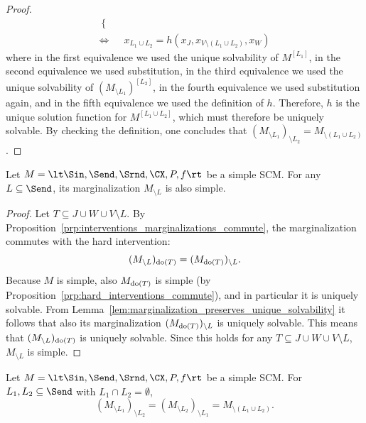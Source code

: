 \begin{proof}
\begin{equation*}
\begin{split}
\begin{cases}
    \end{cases} \\
    \iff &
      x_{L_1\cup L_2} = h(x_J,x_{V\setminus(L_1\cup L_2)},x_W) 
  \end{split}\end{equation*}
  where in the first equivalence we used the unique solvability of $M^{[L_1]}$, in the second
  equivalence we used substitution, in the third equivalence we used the unique solvability of
  $(M_{\setminus L_1})^{[L_2]}$, in the fourth equivalence we used
  substitution again, and in the fifth equivalence we used the definition of $h$.
  Therefore, $h$ is the unique solution function for $M^{[L_1\cup L_2]}$, which must therefore
  be uniquely solvable. By checking the definition, one concludes that $(M_{\setminus L_1})_{\setminus L_2} = M_{\setminus(L_1 \cup L_2)}$.
\end{proof}
\begin{Prp}\label{prp:marginalization_preserves_simplicity}
  Let $M = \lt \Sin, \Send, \Srnd, \CX, P, f \rt$ be a simple SCM. For any $L \subseteq \Send$, 
  its marginalization $M_{\setminus L}$ is also simple.
\end{Prp}
\begin{proof}
  Let $T \subseteq J \cup W \cup V \setminus L$. 
  By Proposition~\ref{prp:interventions_marginalizations_commute}, 
  the marginalization commutes with the hard intervention:
  $$(M_{\setminus L})_{\operatorname{do}(T)} = (M_{\operatorname{do}(T)})_{\setminus L}.$$
  Because $M$ is simple, also $M_{\operatorname{do}(T)}$ is simple (by Proposition~\ref{prp:hard_interventions_commute}), 
  and in particular it is
  uniquely solvable. From Lemma~\ref{lem:marginalization_preserves_unique_solvability} it follows that also
  its marginalization $(M_{\operatorname{do}(T)})_{\setminus L}$ is uniquely solvable. 
  This means that $(M_{\setminus L})_{\operatorname{do}(T)}$ is uniquely solvable. Since this
  holds for any $T \subseteq J \cup W \cup V \setminus L$, $M_{\setminus L}$ is simple.
\end{proof}
\begin{Cor}\label{cor:marginalization_commutes_simple_scm}
  Let $M = \lt \Sin, \Send, \Srnd, \CX, P, f \rt$ be a simple SCM.
  For $L_1, L_2 \subseteq \Send$ with $L_1 \cap L_2 = \emptyset$,
    $$(M_{\setminus L_1})_{\setminus L_2} = (M_{\setminus L_2})_{\setminus L_1} = M_{\setminus (L_1 \cup L_2)}.$$
\end{Cor}

